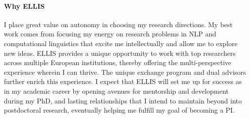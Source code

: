 \documentclass[11pt]{article}
\newcommand\inst{ELLIS\xspace}
\begin{document}
\paragraph{Why \inst}
I place great value on autonomy in choosing my research directions.
My best work comes from focusing my energy on research problems 
in NLP and computational linguistics 
that excite me intellectually and allow me to explore new ideas.
ELLIS provides a unique opportunity to 
work with top researchers across multiple European institutions,
thereby offering the multi-perspective experience wherein I can thrive.
The unique exchange program and dual advisors 
further enrich this experience.
I expect that ELLIS will set me up for success as in my academic career
by opening avenues for mentorship and development
during my PhD, and lasting relationships 
that I intend to maintain beyond into postdoctoral research,  
eventually helping me fulfill my goal of becoming a PI.



\end{document}
